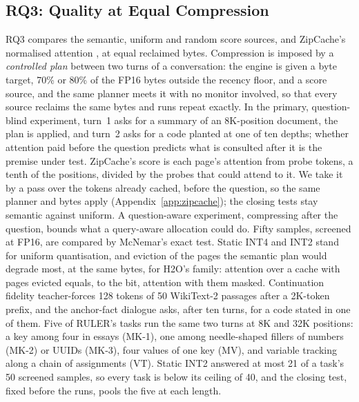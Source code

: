 \documentclass{article}
\begin{document}
\subsection{RQ3: Quality at Equal Compression}
\label{sec:rq3}

RQ3 compares the semantic, uniform and random score sources, and ZipCache's
normalised attention \citep{he2024zipcache}, at equal reclaimed bytes. Compression is imposed by a \textit{controlled plan} between two turns of
a conversation: the engine is given a byte target, 70\% or 80\% of the FP16
bytes outside the recency floor, and a score source, and the same planner meets
it with no monitor involved, so that every source reclaims the same bytes and
runs repeat exactly. In the primary, question-blind experiment, turn~1 asks for
a summary of an 8K-position document, the plan is applied, and turn~2 asks for a
code planted at one of ten depths; whether attention paid before the question
predicts what is consulted after it is the premise under test. ZipCache's
score is each page's attention from probe tokens, a tenth of the positions,
divided by the probes that could attend to it. We take it by a pass over the
tokens already cached, before the question, so the same planner and bytes apply
(Appendix~\ref{app:zipcache}); the closing tests stay semantic against uniform. A
question-aware experiment, compressing after the question, bounds what a
query-aware allocation could do. Fifty samples, screened at FP16, are compared
by McNemar's exact test. Static INT4 and INT2 stand for uniform quantisation,
and eviction of the pages the semantic plan would degrade most, at the same
bytes, for H2O's family: attention over a cache with pages evicted equals, to
the bit, attention with them masked. Continuation fidelity teacher-forces 128
tokens of 50 WikiText-2 passages after a 2K-token prefix, and the anchor-fact
dialogue asks, after ten turns, for a code stated in one of them. Five of
RULER's tasks \citep{hsieh2024ruler} run the same two turns at 8K and 32K
positions: a key among four in essays (MK-1), one among needle-shaped fillers
of numbers (MK-2) or UUIDs (MK-3), four values of one key (MV), and variable
tracking along a chain of assignments (VT). Static INT2 answered at most 21 of
a task's 50 screened samples, so every task is below its ceiling of 40, and the
closing test, fixed before the runs, pools the five at each length.
\end{document}
